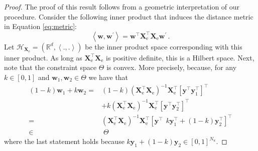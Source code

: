 \documentclass[smallcondensed]{svjour3}\usepackage[]{graphicx}\usepackage[]{color}
\newcommand{\Xe}{\vec{X}_\mathrm{e}  }
\newcommand{\XeT}{\vec{X}_\mathrm{e}^\top}
\newcommand{\G}{\left(\Xe^\top \Xe \right)^{-1}}
\renewcommand{\vec}[1]{\mathbf{#1}}
\begin{document}
\begin{proof}
The proof of this result follows from a geometric interpretation of our procedure. Consider the following inner product that induces the distance metric in Equation \eqref{eq:metric}:
\begin{equation}
\left\langle \vec{w}, \vec{w}^\prime \right\rangle = \vec{w}^\top \vec{X}_\text{e}^\top \vec{X}_\text{e} \vec{w}^\prime \,. \nonumber
\end{equation}
Let $\mathcal{H}_{\vec{X}_\text{e}} = ( \mathbb{R}^d,\left\langle ., . \right\rangle )$ be the inner product space corresponding with this inner product. As long as $\XeT \Xe$ is positive definite, this is a Hilbert space. Next, note that the constraint space $\Theta$ is convex. More precisely, because, for any $k \in [0,1]$ and $\vec{w}_\text{1},\vec{w}_\text{2} \in \Theta$ we have that
\begin{align}
(1-k) \vec{w}_\text{1} + k \vec{w}_\text{2}  = & (1-k) \G \XeT \left[\vec{y}^\top \vec{y}_\text{1}^\top \right]^\top \nonumber \\
 & + k \G \XeT \left[\vec{y}^\top \vec{y}_\text{2}^\top \right]^\top \nonumber \\ 
 = & \G \XeT \left[\vec{y}^\top ~~ k \vec{y}_\text{1}^\top + (1-k) \vec{y}_\text{2}^\top \right]^\top \nonumber \\
 \in & \; \Theta \nonumber
\end{align}
where the last statement holds because $k \vec{y}_\text{1} + (1-k) \vec{y}_\text{2} \in [0,1]^{N_u}$.


\end{proof}
\end{document}
